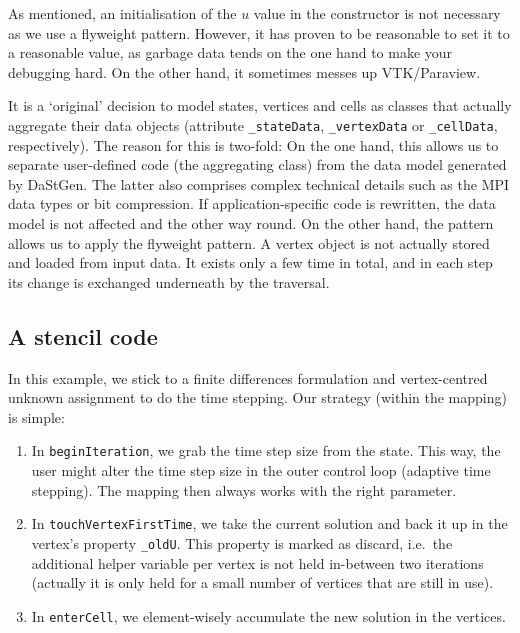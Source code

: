 \noindent
As mentioned, an initialisation of the $u$ value in the constructor is not
necessary as we use a flyweight pattern.
However, it has proven to be reasonable to set it to a reasonable value, as
garbage data tends on the one hand to make your debugging hard.
On the other hand, it sometimes messes up VTK/Paraview.


\begin{remark}
  It is a `original' decision to model states, vertices and cells as classes
  that actually aggregate their data objects (attribute \texttt{\_stateData},
  \texttt{\_vertexData} or \texttt{\_cellData}, respectively).
  The reason for this is two-fold:
  On the one hand, this allows us to separate user-defined code (the
  aggregating class) from the data model generated by DaStGen. The latter also
  comprises complex technical details such as the MPI data types or bit
  compression. If application-specific code is rewritten, the data model is not
  affected and the other way round. On the other hand, the pattern allows us to
  apply the flyweight pattern. A vertex object is not actually stored and loaded
  from input data. It exists only a few time in total, and in each step its
  change is exchanged underneath by the traversal.
\end{remark}




\subsection{A stencil code}

In this example, we stick to a finite differences formulation and
vertex-centred unknown assignment to do the time stepping.
Our strategy (within the mapping) is simple:
\begin{enumerate}
  \item In \texttt{beginIteration}, we grab the time step size from the state.
  This way, the user might alter the time step size in the outer control loop
  (adaptive time stepping).
  The mapping then always works with the right parameter.
  \item In \texttt{touchVertexFirstTime}, we take the current solution and back
  it up in the vertex's property \texttt{\_oldU}. This property is marked as
  discard, i.e.~the additional helper variable per vertex is not held in-between
  two iterations (actually it is only held for a small number of vertices that
  are still in use). 
  \item In \texttt{enterCell}, we element-wisely accumulate the new solution in
  the vertices.
\end{enumerate}

